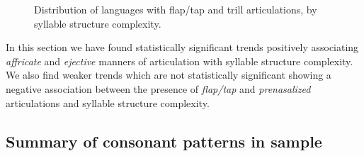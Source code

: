 \begin{figure}
\caption{\label{fig:4.17} Distribution of languages with flap/tap and trill articulations, by syllable structure complexity.}
\end{figure}

  In this section we have found statistically significant trends positively associating \textit{affricate} and \textit{ejective} manners of articulation with syllable structure complexity. We also find weaker trends which are not statistically significant showing a negative association between the presence of \textit{flap/tap} and \textit{prenasalized} articulations and syllable structure complexity.

\subsection{Summary of consonant patterns in sample}\label{sec:4.4.6}

